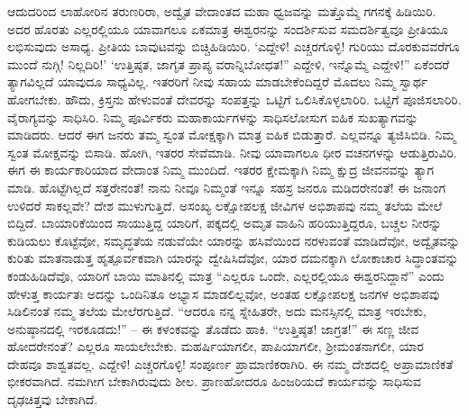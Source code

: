 ಆದುದರಿಂದ ಲಾಹೋರಿನ ತರುಣರಿರಾ, ಅದ್ವೈತ ವೇದಾಂತದ ಮಹಾ ಧ್ವಜವನ್ನು ಮತ್ತೊಮ್ಮೆ ಗಗನಕ್ಕೆ ಹಿಡಿಯಿರಿ. ಅದರ ಹೊರತು ಎಲ್ಲರಲ್ಲಿಯೂ ಯಾವಾಗಲೂ ಏಕಮಾತ್ರ ಈಶ್ವರನನ್ನು ಸಂದರ್ಶಿಸುವ ಸಮದರ್ಶಿತ್ವವೂ ಪ್ರೀತಿಯೂ ಲಭಿಸುವುದು ಅಸಾಧ್ಯ. ಪ್ರೀತಿಯ ಬಾವುಟವನ್ನು ಬಿಚ್ಚಿಹಿಡಿಯಿರಿ. ‘ಎದ್ದೇಳಿ! ಎಚ್ಚರಗೊಳ್ಳಿ! ಗುರಿಯು ದೊರಕುವವರೆಗೂ ಮುಂದೆ ನುಗ್ಗಿ! ನಿಲ್ಲದಿರಿ!’ ‘ಉತ್ತಿಷ್ಠತ, ಜಾಗೃತ ಪ್ರಾಪ್ಯ ವರಾನ್ನಿಬೋಧತ!” ಎದ್ದೇಳಿ, ಇನ್ನೊಮ್ಮೆ ಎದ್ದೇಳಿ!” ಏಕೆಂದರೆ ತ್ಯಾಗವಿಲ್ಲದೆ ಯಾವುದೂ ಸಾಧ್ಯವಿಲ್ಲ. ಇತರರಿಗೆ ನೀವು ಸಹಾಯ ಮಾಡಬೇಕೆಂದಿದ್ದರೆ ಮೊದಲು ನಿಮ್ಮ ಸ್ವಾರ್ಥ ಹೋಗಬೇಕು. ಹೌದು, ಕ್ರಿಸ್ತನು ಹೇಳುವಂತೆ ದೇವರನ್ನು ಸಂಪತ್ತನ್ನು ಒಟ್ಟಿಗೆ ಒಲಿಸಿಕೊಳ್ಳಲಾರಿರಿ. ಒಟ್ಟಿಗೆ ಪೂಜಿಸಲಾರಿರಿ. ವೈರಾಗ್ಯವನ್ನು ಸಾಧಿಸಿರಿ. ನಿಮ್ಮ ಪೂರ್ವಿಕರು ಮಹಾಕಾರ್ಯಗಳನ್ನು ಸಾಧಿಸಲೋಸುಗ ಐಹಿಕ ಸುಖತ್ಯಾಗವನ್ನು ಮಾಡಿದರು. ಆದರೆ ಈಗ ಜನರು ತಮ್ಮ ಸ್ವಂತ ಮೋಕ್ಷಕ್ಕಾಗಿ ಮಾತ್ರ ಐಹಿಕ ಬಿಡುತ್ತಾರೆ. ಎಲ್ಲವನ್ನೂ ತ್ಯಜಿಸಿಬಿಡಿ. ನಿಮ್ಮ ಸ್ವಂತ ಮೋಕ್ಷವನ್ನು ಬಿಸಾಡಿ. ಹೋಗಿ, ಇತರರ ಸೇವೆಮಾಡಿ. ನೀವು ಯಾವಾಗಲೂ ಧೀರ ವಚನಗಳನ್ನು ಆಡುತ್ತಿರುವಿರಿ. ಈಗ ಈ ಕಾರ್ಯಕಾರಿಯಾದ ವೇದಾಂತ ನಿಮ್ಮ ಮುಂದಿದೆ. ಇತರರ ಕ್ಷೇಮಕ್ಕಾಗಿ ನಿಮ್ಮ ಕ್ಷುದ್ರ ಜೀವನವನ್ನು ತ್ಯಾಗ ಮಾಡಿ. ಹೊಟ್ಟೆಗಿಲ್ಲದೆ ಸತ್ತರೇನಂತೆ! ನಾನು ನೀವೂ ನಿಮ್ಮಂತೆ ಇನ್ನೂ ಸಹಸ್ರ ಜನರೂ ಮಡಿದರೇನಂತೆ! ಈ ಜನಾಂಗ ಉಳಿದರೆ ಸಾಕಲ್ಲವೇ? ದೇಶ ಮುಳುಗುತ್ತಿದೆ. ಅಸಂಖ್ಯ ಲಕ್ಷೋಪಲಕ್ಷ ಜೀವಿಗಳ ಅಭಿಶಾಪವು ನಮ್ಮ ತಲೆಯ ಮೇಲೆ ಬಿದ್ದಿದೆ. ಬಾಯಾರಿಕೆಯಿಂದ ಸಾಯುತ್ತಿದ್ದ ಯಾರಿಗೆ, ಪಕ್ಕದಲ್ಲಿ ಅಮೃತ ವಾಹಿನಿ ಹರಿಯುತ್ತಿದ್ದರೂ, ಬಚ್ಚಲ ನೀರನ್ನು ಕುಡಿಯಲು ಕೊಟ್ಟೆವೋ, ಸಮೃದ್ಧತೆಯ ನಡುವೆಯೇ ಯಾರನ್ನು ಹಸಿವೆಯಿಂದ ನರಳುವಂತೆ ಮಾಡಿದೆವೋ, ಅದ್ವೈತವನ್ನು ಕುರಿತು ಮಾತನಾಡುತ್ತ ಹೃತ್ಪೂರ್ವಕವಾಗಿ ಯಾರನ್ನು ದ್ವೇಷಿಸಿದೆವೋ, ಯಾರ ದಮನಕ್ಕಾಗಿ ಲೋಕಾಚಾರ ಸಿದ್ಧಾಂತವನ್ನು ಕಂಡುಹಿಡಿದೆವೊ, ಯಾರಿಗೆ ಬಾಯಿ ಮಾತಿನಲ್ಲಿ ಮಾತ್ರ “ಎಲ್ಲರೂ ಒಂದೇ, ಎಲ್ಲರಲ್ಲಿಯೂ ಈಶ್ವರನಿದ್ದಾನೆ” ಎಂದು ಹೇಳುತ್ತ ಕಾರ್ಯತಃ ಅದನ್ನು ಒಂದಿನಿತೂ ಅಭ್ಯಾಸ ಮಾಡಲಿಲ್ಲವೋ, ಅಂತಹ ಲಕ್ಷೋಪಲಕ್ಷ ಜನಗಳ ಅಭಿಶಾಪವು ಸಿಡಿಲಿನಂತೆ ನಮ್ಮ ತಲೆಯ ಮೇಲೆರಗುತ್ತಿದೆ. “ಆದರೂ ನನ್ನ ಸ್ನೇಹಿತರೇ, ಅದು ಮನಸ್ಸಿನಲ್ಲಿ ಮಾತ್ರ ಇರಬೇಕು, ಅನುಷ್ಠಾನದಲ್ಲಿ ಇರಕೂಡದು!” – ಈ ಕಳಂಕವನ್ನು ತೊಡೆದು ಹಾಕಿ. “ಉತ್ತಿಷ್ಠತ! ಜಾಗ್ರತ!” ಈ ಸಣ್ಣ ಜೀವ ಹೋದರೇನಂತೆ? ಎಲ್ಲರೂ ಸಾಯಲೇಬೇಕು. ಮಹರ್ಷಿಯಾಗಲೀ, ಪಾಪಿಯಾಗಲೀ, ಶ‍್ರೀಮಂತನಾಗಲೀ, ಯಾರ ದೇಹವೂ ಶಾಶ್ವತವಲ್ಲ. ಎದ್ದೇಳಿ! ಎಚ್ಚರಗೊಳ್ಳಿ! ಸಂಪೂರ್ಣ ಪ್ರಾಮಾಣಿಕರಾಗಿರಿ. ಈ ನಮ್ಮ ದೇಶದಲ್ಲಿ ಅಪ್ರಾಮಾಣಿಕತೆ ಭೀಕರವಾಗಿದೆ. ನಮಗೀಗ ಬೇಕಾಗಿರುವುದು ಶೀಲ. ಪ್ರಾಣಹೋದರೂ ಹಿಂಜರಿಯದೆ ಕಾರ್ಯವನ್ನು ಸಾಧಿಸುವ ದೃಢಚಿತ್ತವು ಬೇಕಾಗಿದೆ.

